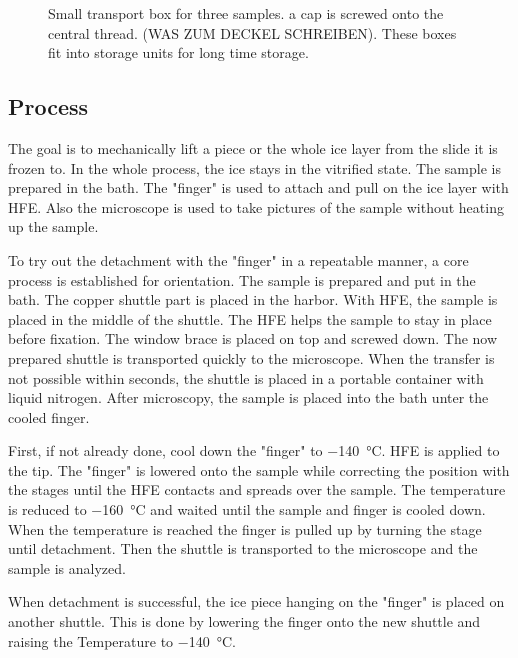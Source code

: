 \begin{figure}[hbt!]
	\centering
	
	\caption{Small transport box for three samples. a cap is screwed onto the central thread. (WAS ZUM DECKEL SCHREIBEN). These boxes fit into storage units for long time storage.}
	\label{fig:transportbox}
\end{figure}

\FloatBarrier

\subsection{Process}

The goal is to mechanically lift a piece or the whole ice layer from the slide it is frozen to. In the whole process, the ice stays in the vitrified state. The sample is prepared in the bath. The "finger" is used to attach and pull on the ice layer with HFE. Also the microscope is used to take pictures of the sample without heating up the sample.

To try out the detachment with the "finger" in a repeatable manner, a core process is established for orientation. The sample is prepared and put in the bath. The copper shuttle part is placed in the harbor. With HFE, the sample is placed in the middle of the shuttle. The HFE helps the sample to stay in place before fixation. The window brace is placed on top and screwed down. The now prepared shuttle is transported quickly to the microscope. When the transfer is not possible within seconds, the shuttle is placed in a portable container with liquid nitrogen. After microscopy, the sample is placed into the bath unter the cooled finger. 

First, if not already done, cool down the "finger" to \SI{-140}{\degreeCelsius}. HFE is applied to the tip. The "finger" is lowered onto the sample while correcting the position with the stages until the HFE contacts and spreads over the sample. The temperature is reduced to \SI{-160}{\degreeCelsius} and waited until the sample and finger is cooled down. When the temperature is reached the finger is pulled up by turning the stage until detachment. Then the shuttle is transported to the microscope and the sample is analyzed. 

When detachment is successful, the ice piece hanging on the "finger" is placed on another shuttle. This is done by lowering the finger onto the new shuttle and raising the Temperature to \SI{-140}{\degreeCelsius}.

